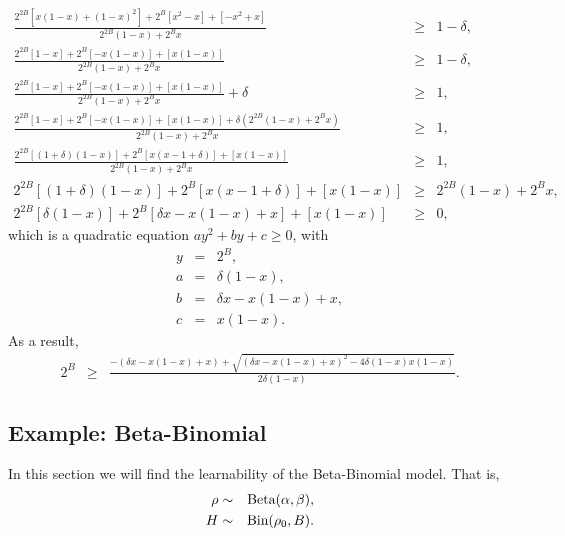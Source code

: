 \begin{eqnarray}
%
 \frac
  {2^{2B}\left[x (1-x)+(1-x)^2\right]+2^B\left[x^2-x\right]+\left[-x^2
   +{x}\right]}
  {2^{2B}(1-x)+2^Bx}
&\geq& 1-\delta,\\
%
 \frac
  {2^{2B}\left[1-x\right]+2^B\left[-x(1-x)\right]+\left[x(1-x)\right]}
  {2^{2B}(1-x)+2^Bx}
&\geq& 1-\delta,\\
%
 \frac
  {2^{2B}\left[1-x\right]+2^B\left[-x(1-x)\right]+\left[x(1-x)\right]}
  {2^{2B}(1-x)+2^Bx} + \delta
&\geq& 1,\\
%
 \frac
  {2^{2B}\left[1-x\right]+2^B\left[-x(1-x)\right]+\left[x(1-x)\right]
   + \delta(2^{2B}(1-x)+2^Bx)}
  {2^{2B}(1-x)+2^Bx}
&\geq& 1,\\
%
 \frac
  {2^{2B}\left[(1+\delta)(1-x)\right]+2^B\left[x(x-1+\delta)\right]+\left[x(1-x)\right]}
  {2^{2B}(1-x)+2^Bx}
&\geq& 1,\\
%
  {2^{2B}\left[(1+\delta)(1-x)\right]+2^B\left[x(x-1+\delta)\right]+\left[x(1-x)\right]}
&\geq& {2^{2B}(1-x)+2^Bx},\\
%
  2^{2B}\left[\delta(1-x)\right]
  +2^B\left[\delta x-x(1-x)+x\right]
  +\left[ x(1-x)\right]
&\geq& 0,
\end{eqnarray}
which is a quadratic equation $ay^2+by+c\geq0$, with
\begin{eqnarray}
y &=& 2^B,\\
a &=& \delta(1-x),\\
b &=& \delta x-x(1-x)+x,\\
c &=& x(1-x).
\end{eqnarray}
As a result,
\begin{eqnarray}
2^B &\geq&
 \frac{
  -(\delta x - x(1-x) + x)
  +\sqrt{
   (\delta x - x(1-x) + x)^2 - 4\delta(1-x)x(1-x)
  }
 }
 {2\delta(1-x)}.
\end{eqnarray}

\subsection{Example: Beta-Binomial}

\label{sec:guarantees:beta-bin}

In this section we will find the learnability of the Beta-Binomial model. That is,
\begin{eqnarray}
\label{sec:guarantees:eqn:beta-bin-beta}
\rho &\sim& \mbox{Beta}(\alpha,\beta),\\
\label{sec:guarantees:eqn:beta-bin-bin}
H &\sim& \mbox{Bin}(\rho_0, B).
\end{eqnarray}

